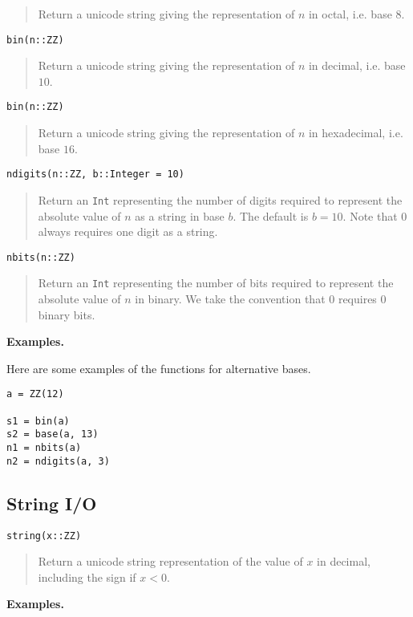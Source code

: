 \documentclass[a4paper,10pt]{article}
\newcommand{\code}{\lstinline}
\newcommand{\desc}[1]{\vspace{-3mm}\begin{quote}#1\end{quote}}
\begin{document}
{{{\desc{Return a unicode string giving the representation of $n$ in octal, i.e. base $8$.}

\begin{lstlisting}
bin(n::ZZ)
\end{lstlisting}

\desc{Return a unicode string giving the representation of $n$ in decimal, i.e. base $10$.}

\begin{lstlisting}
bin(n::ZZ)
\end{lstlisting}

\desc{Return a unicode string giving the representation of $n$ in hexadecimal, i.e. base $16$.}

\begin{lstlisting}
ndigits(n::ZZ, b::Integer = 10)
\end{lstlisting}

\desc{Return an \code{Int} representing the number of digits required to represent the
absolute value of $n$ as a string in base $b$. The default is $b = 10$. Note that $0$
always requires one digit as a string.}

\begin{lstlisting}
nbits(n::ZZ)
\end{lstlisting}

\desc{Return an \code{Int} representing the number of bits required to represent the
absolute value of $n$ in binary. We take the convention that $0$ requires $0$ binary 
bits.}

\textbf{Examples.}

Here are some examples of the functions for alternative bases.

\begin{lstlisting}
a = ZZ(12)

s1 = bin(a)
s2 = base(a, 13)
n1 = nbits(a)
n2 = ndigits(a, 3)
\end{lstlisting}

\subsection{String I/O}

\begin{lstlisting}
string(x::ZZ)
\end{lstlisting}

\desc{Return a unicode string representation of the value of $x$ in decimal, including the sign
if $x < 0$.}

\textbf{Examples.}

}}}
\end{document}
